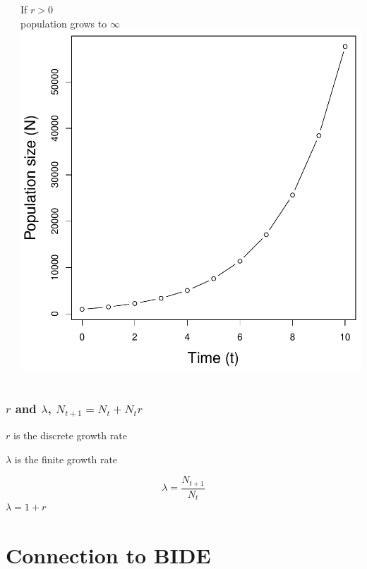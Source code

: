 \documentclass[color=usenames,dvipsnames]{beamer}\usepackage[]{graphicx}\usepackage[]{color}
\begin{document}
\begin{frame}
\begin{columns}
\begin{column}{0.33\textwidth}
    \end{column}
    \begin{column}{0.33\textwidth}
      \small
      \centering
      If $r > 0$ \\ population grows to $\infty$ \\
      \includegraphics[width=\textwidth]{figs/rg0}
    \end{column}
  \end{columns}
\end{frame}







\begin{frame}
  \frametitle{$r$ and $\lambda$, $N_{t+1} = N_t + N_tr$}
  \Large
  $r$ is the discrete growth rate \par
  \vspace{0.5cm}
  $\lambda$ is the finite growth rate \par
  \[
  \lambda = \frac{N_{t+1}}{N_t}
  \]
  \vspace{0.5cm}
  $\lambda = 1 + r$
\end{frame}





\section{Connection to BIDE}
\end{document}
